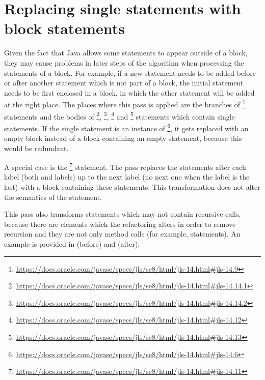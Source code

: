 \section{Replacing single statements with block statements}

Given the fact that Java allows some statements to appear outside of a block, they may cause problems in later steps of
the algorithm when processing the statements of a block. For example, if a new statement needs to be added before or
after another statement which is not part of a block, the initial statement needs to be first enclosed in a block, in
which the other statement will be added at the right place.
The places where this pass is applied are the branches of
\footnote{\url{https://docs.oracle.com/javase/specs/jls/se8/html/jls-14.html#jls-14.9}} statements and the
bodies of \footnote{\url{https://docs.oracle.com/javase/specs/jls/se8/html/jls-14.html#jls-14.14.1}},
\footnote{\url{https://docs.oracle.com/javase/specs/jls/se8/html/jls-14.html#jls-14.14.2}},
\footnote{\url{https://docs.oracle.com/javase/specs/jls/se8/html/jls-14.html#jls-14.12}} and
\footnote{\url{https://docs.oracle.com/javase/specs/jls/se8/html/jls-14.html#jls-14.13}} statements
which contain single statements. If the single statement is an instance of
\footnote{\url{https://docs.oracle.com/javase/specs/jls/se8/html/jls-14.html#jls-14.6}},
it gets replaced with an empty block instead of a block containing an empty statement, because this would be redundant.

A special case is the \footnote{\url{https://docs.oracle.com/javase/specs/jls/se8/html/jls-14.html#jls-14.11}}
statement. The pass replaces the statements after each  label (both  and  labels)
up to the next  label (no next one when the label is the last) with a block containing these statements.
This transformation does not alter the semantics of the  statement.

This pass also transforms statements which may not contain recursive calls, because there are elements which the
refactoring alters in order to remove recursion and they are not only method calls (for example, 
statements). An example is provided in 
(before) and  (after).

